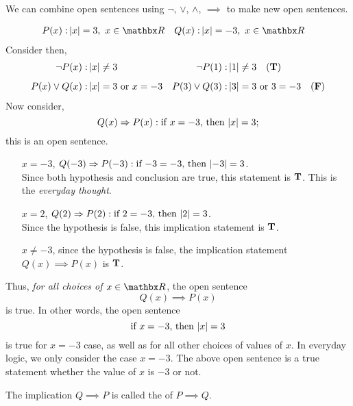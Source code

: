 We can combine open sentences using $\neg,\,\vee,\,\wedge,\,\implies$ to make new open sentences.
\begin{example}
\begin{align*}
P(x):& \abs{x} = 3,\ x \in \rr & Q(x):& \abs{x} = -3,\ x \in \rr
\end{align*}
Consider then,
\begin{align*}
\neg P(x):& \left\lvert x\right\rvert \neq 3 & \neg P(1) :& \left\lvert1\right\rvert \neq 3 \quad (\mathbf{T}) \\[0.5em]
P(x) \vee Q(x):& \left\lvert x\right\rvert = 3 \text{ or } x = -3 & P(3) \vee Q(3) :& \left\lvert3\right\rvert = 3 \text{ or } 3 = -3 \quad (\mathbf{F})\\
\end{align*}
Now consider,
\[Q(x) \Rightarrow P(x): \text{if $x = -3$, then $\left\lvert x\right\rvert = 3$};\]
this is an open sentence. 
\begin{itemize}[leftmargin=4.5em,itemsep=1em]
\item[$x = -3$,] $Q(-3) \Rightarrow P(-3): \text{if $-3 = -3$, then $\left\lvert-3\right\rvert = 3$}$.\\[0.5em]
Since both hypothesis and conclusion are true, this statement is $\mathbf{T}$. This is the \emph{everyday thought}.
\item[$x = 2$,] $Q(2) \Rightarrow P(2): \text{if $2 = -3$, then $\left\lvert2\right\rvert = 3$}$.\\[0.5em]
Since the hypothesis is false, this implication statement is $\mathbf{T}$.
\item[$x \neq -3$,] since the hypothesis is false, the implication statement $Q(x) \implies P(x)$ is $\mathbf{T}$.
\end{itemize}
Thus, \emph{for all choices of $x \in \rr$}, the open sentence
\[Q(x) \implies P(x)\]
is true. In other words, the open sentence
\[\text{if $x = -3$, then $\left\lvert x\right\rvert = 3$}\]
is true for $x = -3$ case, as well as for all other choices of values of $x$. In everyday logic, we only consider the case $x = -3$. The above open sentence is a true statement whether the value of $x$ is $-3$ or not.
\end{example}

\vspace*{1em}

\begin{definition}[Converse]
The implication $Q \implies P$ is called the  of $P \implies Q$.
\end{definition}

\vspace*{1em}

